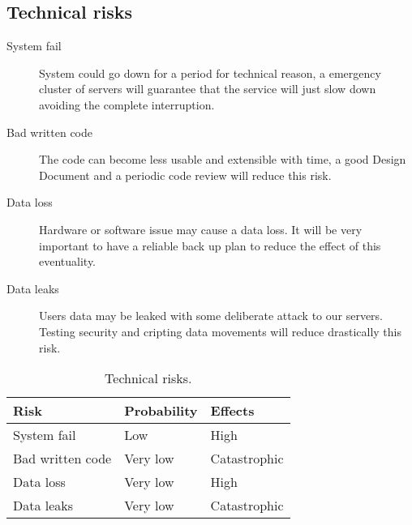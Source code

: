 \subsection{Technical risks}

\begin{description}

    \item[System fail] System could go down for a period for technical reason, a emergency cluster of servers will guarantee that the service will just slow down avoiding the complete interruption.

    \item[Bad written code] The code can become less usable and extensible with time, a good Design Document and a periodic code review will reduce this risk.

    \item[Data loss] Hardware or software issue may cause a data loss. It will be very important to have a reliable back up plan to reduce the effect of this eventuality.

    \item[Data leaks] Users data may be leaked with some deliberate attack to our servers. Testing security and cripting data movements will reduce drastically this risk.

\end{description}

\begin{table}[!htbp]
\centering
    \begin{tabular}{| l | l | l |}
        \hline
        \textbf{Risk}                   & \textbf{Probability}  & \textbf{Effects}  \\
        \hline
        System fail                        & Low              & High              \\  
        \hline
        Bad written code                  & Very low                   & Catastrophic          \\
        \hline
        Data loss                       & Very low                   & High      \\
        \hline
        Data leaks                      & Very low              & Catastrophic      \\
        \hline
    \end{tabular}
    \caption{Technical risks.}
    \label{tab:technical-risks}
\end{table}